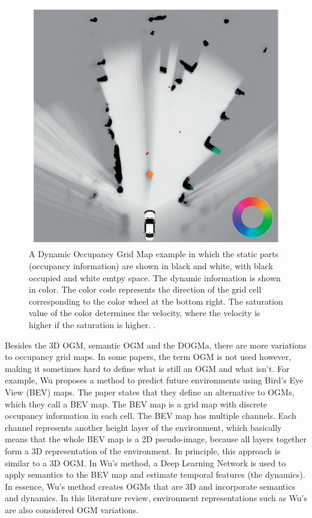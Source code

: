\begin{figure}[h]
	\centering
	\includegraphics[width=0.4\linewidth]{Figures/Occupancy_Grid_Map/DOGMa_example}
	\caption{A Dynamic Occupancy Grid Map example in which the static parts (occupancy information) are shown in black and white, with black occupied and white emtpy space. The dynamic information is shown in color. The color code represents the direction of the grid cell corresponding to the color wheel at the bottom right. The saturation value of the color determines the velocity, where the velocity is higher if the saturation is higher. \cite{nuss2018random}.}
	\label{fig:DOGMa_example}
\end{figure}

Besides the 3D \gls{OGM}, semantic \gls{OGM} and the DOGMa, there are more variations to occupancy grid maps. In some papers, the term \gls{OGM} is not used however, making it sometimes hard to define what is still an \gls{OGM} and what isn't. 
For example, Wu \cite{wu2020motionnet} proposes a method to predict future environments using Bird's Eye View (BEV) maps. The paper states that they define an alternative to OGMs, which they call a BEV map. The BEV map is a grid map with discrete occupancy information in each cell. The BEV map has multiple channels. Each channel represents another height layer of the environment, which basically means that the whole BEV map is a 2D pseudo-image, because all layers together form a 3D representation of the environment. In principle, this approach is similar to a 3D \gls{OGM}. In Wu's method, a Deep Learning Network is used to apply semantics to the BEV map and estimate temporal features (the dynamics). In essence, Wu's method creates OGMs that are 3D and incorporate semantics and dynamics. In this literature review, environment representations such as Wu's are also considered \gls{OGM} variations. \\

